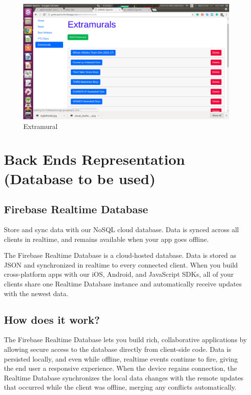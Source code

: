\newpage

\begin{figure}[ht]
\centering
\includegraphics[scale=0.35]{images/ExtramuralHeroku.png}
\caption{Extramural}
\end{figure}


\newpage
\section{Back Ends Representation (Database to be used)}
\subsection{Firebase Realtime Database}
Store and sync data with our NoSQL cloud database. Data is synced across all clients in realtime, and remains available when your app goes offline.

The Firebase Realtime Database is a cloud-hosted database. Data is stored as JSON and synchronized in realtime to every connected client. When you build cross-platform apps with our iOS, Android, and JavaScript SDKs, all of your clients share one Realtime Database instance and automatically receive updates with the newest data.
\subsection{How does it work?}
The Firebase Realtime Database lets you build rich, collaborative applications by allowing secure access to the database directly from client-side code. Data is persisted locally, and even while offline, realtime events continue to fire, giving the end user a responsive experience. When the device regains connection, the Realtime Database synchronizes the local data changes with the remote updates that occurred while the client was offline, merging any conflicts automatically.


